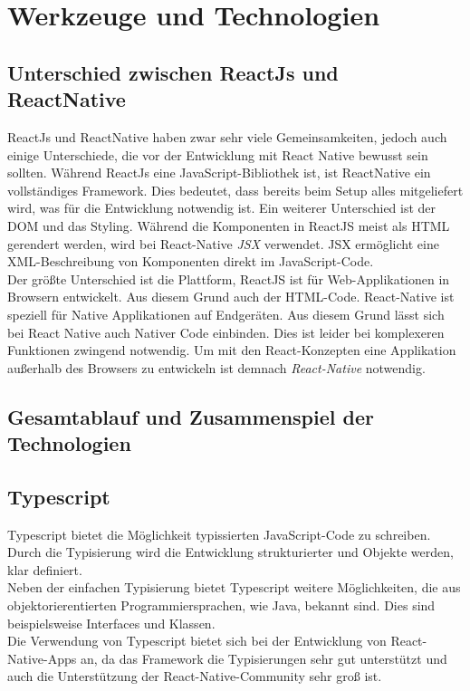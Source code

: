 \section{Werkzeuge und Technologien}
\subsection{Unterschied zwischen ReactJs und ReactNative}
ReactJs und ReactNative haben zwar sehr viele Gemeinsamkeiten, jedoch auch einige Unterschiede, die vor der Entwicklung mit React Native bewusst sein sollten.
Während ReactJs eine JavaScript-Bibliothek ist, ist ReactNative ein vollständiges Framework. Dies bedeutet, dass bereits beim Setup alles mitgeliefert wird, was für die
Entwicklung notwendig ist. Ein weiterer Unterschied ist der DOM und das Styling. Während die Komponenten in ReactJS meist als HTML gerendert werden, wird bei React-Native
\textit{JSX} verwendet. JSX ermöglicht eine XML-Beschreibung von Komponenten direkt im JavaScript-Code.\\
Der größte Unterschied ist die Plattform, ReactJS ist für Web-Applikationen in Browsern entwickelt. Aus diesem Grund auch der HTML-Code. React-Native ist speziell für Native Applikationen auf
Endgeräten. Aus diesem Grund lässt sich bei React Native auch Nativer Code einbinden. Dies ist leider bei komplexeren Funktionen zwingend notwendig. Um mit den React-Konzepten eine Applikation außerhalb des
Browsers zu entwickeln ist demnach \textit{React-Native} notwendig. \cite{ReactJSvsReactNative:online}

\subsection{Gesamtablauf und Zusammenspiel der Technologien}

\subsection{Typescript}
Typescript bietet die Möglichkeit typissierten JavaScript-Code zu schreiben.
Durch die Typisierung wird die Entwicklung strukturierter und Objekte werden,
klar definiert. \\
Neben der einfachen Typisierung bietet Typescript weitere Möglichkeiten, die aus
objektorierentierten Programmiersprachen, wie Java, bekannt sind. Dies sind beispielsweise
Interfaces und Klassen. \\
Die Verwendung von Typescript bietet sich bei der Entwicklung von React-Native-Apps an,
da das Framework die Typisierungen sehr gut unterstützt und auch die Unterstützung der React-Native-Community sehr groß ist. \cite{TypescriptReasons:online}


